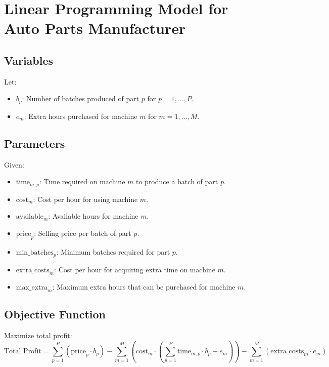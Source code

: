 \documentclass{article}
\begin{document}
\section*{Linear Programming Model for Auto Parts Manufacturer}

\subsection*{Variables}

Let:
\begin{itemize}
    \item \( b_p \): Number of batches produced of part \( p \) for \( p = 1, \ldots, P \).
    \item \( e_m \): Extra hours purchased for machine \( m \) for \( m = 1, \ldots, M \).
\end{itemize}

\subsection*{Parameters}

Given:
\begin{itemize}
    \item \( \text{time}_{m,p} \): Time required on machine \( m \) to produce a batch of part \( p \).
    \item \( \text{cost}_m \): Cost per hour for using machine \( m \).
    \item \( \text{available}_m \): Available hours for machine \( m \).
    \item \( \text{price}_p \): Selling price per batch of part \( p \).
    \item \( \text{min\_batches}_p \): Minimum batches required for part \( p \).
    \item \( \text{extra\_costs}_m \): Cost per hour for acquiring extra time on machine \( m \).
    \item \( \text{max\_extra}_m \): Maximum extra hours that can be purchased for machine \( m \).
\end{itemize}

\subsection*{Objective Function}

Maximize total profit:
\[
\text{Total Profit} = \sum_{p=1}^{P} \left( \text{price}_p \cdot b_p \right) - \sum_{m=1}^{M} \left( \text{cost}_m \cdot \left( \sum_{p=1}^{P} \text{time}_{m,p} \cdot b_p + e_m \right) \right) - \sum_{m=1}^{M} \left( \text{extra\_costs}_m \cdot e_m \right)
\]
\end{document}
